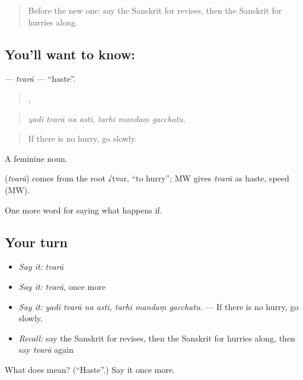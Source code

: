 \begin{quote}
Before the new one: say the Sanskrit for revises, then the Sanskrit for hurries along.
\end{quote}

\subsection*{You'll want to know: }
\textbf{} — \emph{tvarā} — \textquotedblleft{}haste\textquotedblright{}.

\begin{quote}
   ,   
\end{quote}

\begin{quote}
\emph{yadi tvarā na asti, tarhi mandaṃ gacchatu.}
\end{quote}

\begin{quote}
If there is no hurry, go slowly.
\end{quote}

A feminine noun.

\begin{cousinweb}
\textbf{} (\emph{tvarā}) comes from the root √tvar, \textquotedblleft{}to hurry\textquotedblright{}; MW gives \emph{tvarā} as haste, speed (MW).
\end{cousinweb}

\begin{grammarlens}[title={What you've built}]
One more word for saying what happens if.
\end{grammarlens}

\subsection*{Your turn}
\begin{itemize}
\raggedright
  \item \emph{Say it:} \emph{tvarā}
  \item \emph{Say it:} \emph{tvarā}, once more
  \item \emph{Say it:} \emph{yadi tvarā na asti, tarhi mandaṃ gacchatu.} — If there is no hurry, go slowly.
  \item \emph{Recall:} say the Sanskrit for revises, then the Sanskrit for hurries along, then say \emph{tvarā} again
\end{itemize}

\begin{tcolorbox}[breakable,colback=teal!4,colframe=teal!35!black,title={Before you move on}]
What does  mean? (\textquotedblleft{}Haste\textquotedblright{}.) Say it once more.
\end{tcolorbox}
